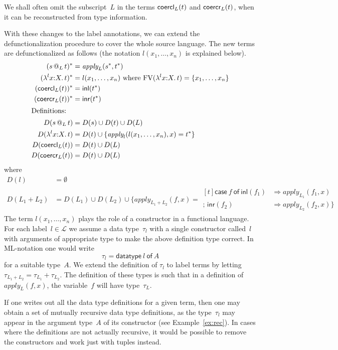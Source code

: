 \documentclass{LMCS}
\makeatletter
\theoremstyle{definition}
\theoremstyle{plain}
\newcommand{\kw}[1]{\mathsf{#1}}
\newcommand{\Capply}{\textit{apply}}
\newcommand{\LL}{\mathcal{L}}
\newcommand{\tlaml}[4]{\lambda^{#3} {#1}{:}{#2}.\, {#4}}
\newcommand{\tappl}[3]{{#1} {\,@_{#2}\,} {#3}}
\newcommand{\tmcase}[5]{\!\begin{aligned}[t]
  \kw{case}\ #1\ \kw{of}\ 
     \kw{inl}(#2) &\Rightarrow #3 \\[-.27em]
    ;\, \kw{inr}(#4) &\Rightarrow #5    
  \end{aligned}
  }
\makeatother
\begin{document}
We shall often omit the subscript~$L$ in the terms $\Coercl{L}{t}$ and
$\Coercr{L}{t}$, when it can be reconstructed from type information.

With these changes to the label annotations, we can extend the
defunctionalization procedure to cover the whole source language.
The new terms are defunctionalized as follows (the notation
$l(x_1,\dots, x_n)$ is explained below).
\begin{align*}
  (\tappl s L t)^* &= \Capply_L(s^*, t^*)\\
  (\tlaml x X l t)^* &= l(x_1,\dots, x_n) \text{ where $\mathrm{FV}(\tlaml x X l t)=\{x_1,\dots, x_n\}$} \\
  (\Coercl{L}{t})^* &= \kw{inl}(t^*) \\
  (\Coercr{L}{t})^* &= \kw{inr}(t^*) \\
\intertext{Definitions:}
  D(\tappl s L t) &= D(s) \cup D(t) \cup D(L)\\
  D(\tlaml x X l t) &= D(t) \cup \{ \Capply_l(l(x_1,\dots, x_n), x) = t^* \} \\
  D(\Coercl{L}{t}) &= D(t) \cup D(L)\\
  D(\Coercr{L}{t}) &= D(t) \cup D(L)
\end{align*}
where
\begin{align*}
  D(l) &= \emptyset \\
  D(L_1 + L_2) &= D(L_1) \cup D(L_2) \cup 
   \{\Capply_{L_1+L_2}(f,x) =
   \tmcase f {f_1} {\Capply_{L_1}(f_1, x)} {f_2} {\Capply_{L_2}(f_2, x)\}}
\end{align*}
The term $l(x_1,\dots, x_n)$ plays the role of a constructor in a 
functional language. For each label~$l \in \LL$ we assume a 
data type~$\tau_l$ with a single constructor called~$l$ with
arguments of appropriate type to make the above definition type correct. 
In ML-notation one would write
\[
  \tau_{l} = \kw{datatype}\ l\ \kw{of}\ A
\]
for a suitable type~$A$.
We extend the definition of $\tau_l$ to label terms by letting 
$\tau_{L_1+L_2} = \tau_{L_1} + \tau_{L_2}$.
The definition of these types is 
such that in a definition of $\Capply_L(f, x)$, 
the variable~$f$ will have type~$\tau_{L}$.

If one writes out all the data type definitions for a given term,
then one may obtain a set of mutually recursive data type definitions,
as the type~$\tau_l$ may appear in the argument type~$A$ of
its constructor (see Example~\ref{ex:rec}).
In cases where the definitions are not actually recursive, it would be
possible to remove the constructors and work just with tuples instead. 
\end{document}
